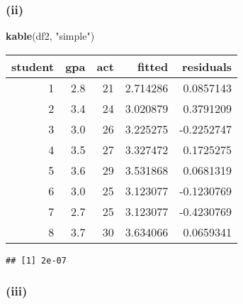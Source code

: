 \documentclass[
]{article}
\newenvironment{Shaded}{\begin{snugshade}}{\end{snugshade}}
\newcommand{\CommentTok}[1]{\textcolor[rgb]{0.56,0.35,0.01}{\textit{#1}}}
\newcommand{\DataTypeTok}[1]{\textcolor[rgb]{0.13,0.29,0.53}{#1}}
\newcommand{\FloatTok}[1]{\textcolor[rgb]{0.00,0.00,0.81}{#1}}
\newcommand{\KeywordTok}[1]{\textcolor[rgb]{0.13,0.29,0.53}{\textbf{#1}}}
\newcommand{\NormalTok}[1]{#1}
\newcommand{\OperatorTok}[1]{\textcolor[rgb]{0.81,0.36,0.00}{\textbf{#1}}}
\newcommand{\StringTok}[1]{\textcolor[rgb]{0.31,0.60,0.02}{#1}}
\begin{document}
\hypertarget{ii-2}{%
\subsubsection{(ii)}\label{ii-2}}

\begin{Shaded}
\end{Shaded}

\begin{Shaded}
\begin{Highlighting}[]
\KeywordTok{kable}\NormalTok{(df2, }\StringTok{"simple"}\NormalTok{)}
\end{Highlighting}
\end{Shaded}

\begin{longtable}[]{@{}rrrrr@{}}
\toprule
student & gpa & act & fitted & residuals\tabularnewline
\midrule
\endhead
1 & 2.8 & 21 & 2.714286 & 0.0857143\tabularnewline
2 & 3.4 & 24 & 3.020879 & 0.3791209\tabularnewline
3 & 3.0 & 26 & 3.225275 & -0.2252747\tabularnewline
4 & 3.5 & 27 & 3.327472 & 0.1725275\tabularnewline
5 & 3.6 & 29 & 3.531868 & 0.0681319\tabularnewline
6 & 3.0 & 25 & 3.123077 & -0.1230769\tabularnewline
7 & 2.7 & 25 & 3.123077 & -0.4230769\tabularnewline
8 & 3.7 & 30 & 3.634066 & 0.0659341\tabularnewline
\bottomrule
\end{longtable}

\begin{Shaded}
\end{Shaded}

\begin{verbatim}
## [1] 2e-07
\end{verbatim}

\hypertarget{iii-2}{%
\subsubsection{(iii)}\label{iii-2}}
\end{document}

